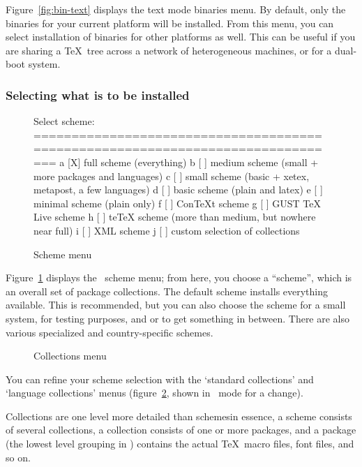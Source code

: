 \documentclass{article}
\begin{document}
Figure~\ref{fig:bin-text} displays the text mode binaries menu.  By
default, only the binaries for your current platform will be installed.
From this menu, you can select installation of binaries for other
platforms as well.  This can be useful if you are sharing a \TeX\
tree across a network of heterogeneous machines, or for a dual-boot
system.

\subsubsection{Selecting what is to be installed}
\label{sec:components}

\begin{figure}[tbh]
\begin{boxedverbatim}
Select scheme:
===============================================================================
 a [X] full scheme (everything)
 b [ ] medium scheme (small + more packages and languages)
 c [ ] small scheme (basic + xetex, metapost, a few languages)
 d [ ] basic scheme (plain and latex)
 e [ ] minimal scheme (plain only)
 f [ ] ConTeXt scheme
 g [ ] GUST TeX Live scheme
 h [ ] teTeX scheme (more than medium, but nowhere near full)
 i [ ] XML scheme
 j [ ] custom selection of collections
\end{boxedverbatim}
\caption{Scheme menu}\label{fig:scheme-text}
\end{figure}

Figure~\ref{fig:scheme-text} displays the \TL\ scheme menu; from here,
you choose a ``scheme'', which is an overall set of package collections.
The default \optname{full} scheme installs everything available.  This
is recommended, but you can also choose the \optname{basic} scheme for a
small system, \optname{minimal} for testing purposes, and
 or  to get something in between.  There
are also various specialized and country-specific schemes.

\begin{figure}[tb]
\caption{Collections menu}\label{fig:collections-gui}
\end{figure}

You can refine your scheme selection with the `standard collections' and
`language collections' menus (figure~\ref{fig:collections-gui}, shown in
\GUI\ mode for a change).

Collections are one level more detailed than schemes\Dash in essence, a
scheme consists of several collections, a collection consists of one or
more packages, and a package (the lowest level grouping in \TL) contains
the actual \TeX\ macro files, font files, and so on.
\end{document}
